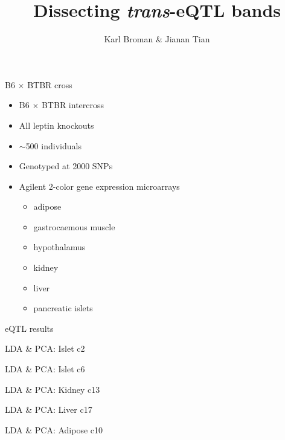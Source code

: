 \documentclass[12pt,t]{beamer}
\title{Dissecting \emph{trans}-eQTL bands}
\author{Karl Broman \& Jianan Tian}
\institute{Biostatistics \& Medical Informatics, UW{\textendash}Madison}
\date{}
\begin{document}
{
\frame{
  \titlepage
}
}


\begin{frame}[c]{B6 $\times$ BTBR cross}

  \begin{itemize}
  \item B6 $\times$ BTBR intercross
  \item All leptin knockouts
  \item $\sim$500 individuals
  \item Genotyped at 2000 SNPs
  \item Agilent 2-color gene expression microarrays
    \begin{itemize}
    \item adipose
    \item gastrocaemous muscle
    \item hypothalamus
    \item kidney
    \item liver
    \item pancreatic islets
    \end{itemize}
  \end{itemize}


\end{frame}


\begin{frame}[c]{eQTL results}


\end{frame}


\begin{frame}[c]{LDA \& PCA: Islet c2}
\end{frame}

\begin{frame}[c]{LDA \& PCA: Islet c6}
\end{frame}

\begin{frame}[c]{LDA \& PCA: Kidney c13}
\end{frame}

\begin{frame}[c]{LDA \& PCA: Liver c17}
\end{frame}

\begin{frame}[c]{LDA \& PCA: Adipose c10}
\end{frame}
\end{document}
